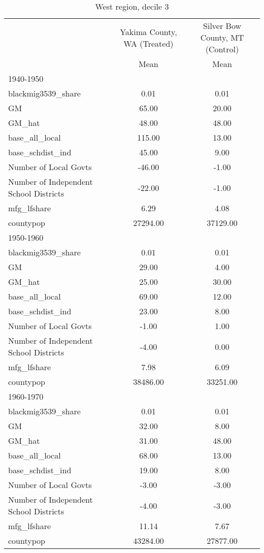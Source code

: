 \begin{table}[htbp]\centering
\def\sym#1{\ifmmode^{#1}\else\(^{#1}\)\fi}
\caption{West region, decile 3 \label{tab1}}
\begin{tabular}{l*{2}{c}}
\toprule
                    &\multicolumn{1}{c}{Yakima County, WA (Treated)}&\multicolumn{1}{c}{Silver Bow County, MT (Control)}\\
                    &        Mean&        Mean\\
\midrule
1940-1950           &            &            \\
blackmig3539\_share  &        0.01&        0.01\\
GM                  &       65.00&       20.00\\
GM\_hat              &       48.00&       48.00\\
base\_all\_local      &      115.00&       13.00\\
base\_schdist\_ind    &       45.00&        9.00\\
Number of Local Govts&      -46.00&       -1.00\\
Number of Independent School Districts&      -22.00&       -1.00\\
mfg\_lfshare         &        6.29&        4.08\\
countypop           &    27294.00&    37129.00\\
\midrule
1950-1960           &            &            \\
blackmig3539\_share  &        0.01&        0.01\\
GM                  &       29.00&        4.00\\
GM\_hat              &       25.00&       30.00\\
base\_all\_local      &       69.00&       12.00\\
base\_schdist\_ind    &       23.00&        8.00\\
Number of Local Govts&       -1.00&        1.00\\
Number of Independent School Districts&       -4.00&        0.00\\
mfg\_lfshare         &        7.98&        6.09\\
countypop           &    38486.00&    33251.00\\
\midrule
1960-1970           &            &            \\
blackmig3539\_share  &        0.01&        0.01\\
GM                  &       32.00&        8.00\\
GM\_hat              &       31.00&       48.00\\
base\_all\_local      &       68.00&       13.00\\
base\_schdist\_ind    &       19.00&        8.00\\
Number of Local Govts&       -3.00&       -3.00\\
Number of Independent School Districts&       -4.00&       -3.00\\
mfg\_lfshare         &       11.14&        7.67\\
countypop           &    43284.00&    27877.00\\
\bottomrule
\end{tabular}
\end{table}
